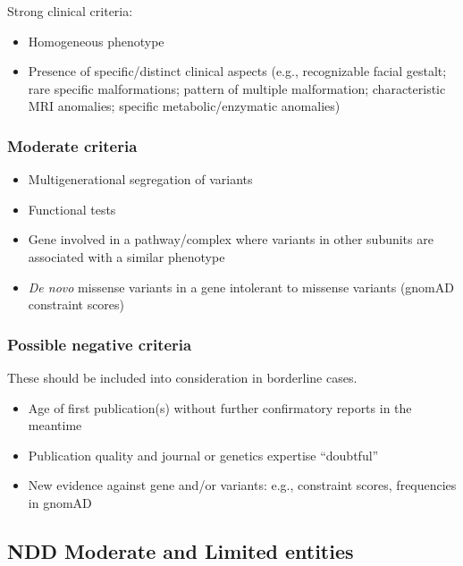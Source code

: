 \documentclass[
]{article}
\providecommand{\tightlist}{%
  \setlength{\itemsep}{0pt}\setlength{\parskip}{0pt}}
\begin{document}
Strong clinical criteria:

\begin{itemize}
\tightlist
\item
  Homogeneous phenotype
\item
  Presence of specific/distinct clinical aspects (e.g., recognizable facial gestalt; rare specific malformations; pattern of multiple malformation; characteristic MRI anomalies; specific metabolic/enzymatic anomalies)
\end{itemize}

\hypertarget{moderate-criteria}{%
\subsubsection{Moderate criteria}\label{moderate-criteria}}

\begin{itemize}
\tightlist
\item
  Multigenerational segregation of variants
\item
  Functional tests
\item
  Gene involved in a pathway/complex where variants in other subunits are associated with a similar phenotype
\item
  \emph{De novo} missense variants in a gene intolerant to missense variants (gnomAD constraint scores)
\end{itemize}

\hypertarget{possible-negative-criteria}{%
\subsubsection{Possible negative criteria}\label{possible-negative-criteria}}

These should be included into consideration in borderline cases.

\begin{itemize}
\tightlist
\item
  Age of first publication(s) without further confirmatory reports in the meantime
\item
  Publication quality and journal or genetics expertise ``doubtful''
\item
  New evidence against gene and/or variants: e.g., constraint scores, frequencies in gnomAD
\end{itemize}

\hypertarget{ndd-moderate-and-limited-entities}{%
\subsection{NDD Moderate and Limited entities}\label{ndd-moderate-and-limited-entities}}
\end{document}
